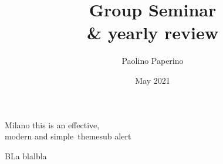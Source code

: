 \documentclass[11pt,xcolor={dvipsnames}]{beamer}
\title{Group Seminar\\ \& yearly review}
\author{Paolino Paperino}
\institute
{Group of {\bfseries Donald Duck}, \\ University of Paperopoli
}
\date{May 2021}
\begin{document}
\maketitle 
\begin{frame}{Milano this is an effective,\\modern and simple\ theme}{sub}
\alert{alert}
\begin{block}{BLa}
	blalbla
\end{block}
\end{frame}



\begin{frame}[plain]
	\raggedleft
	{  \inserttitle}
	


\end{frame}
\end{document}

